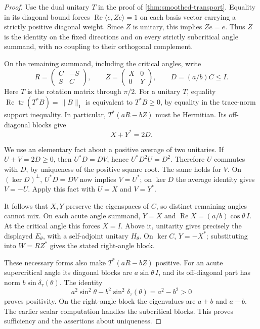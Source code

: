 \begin{proof}
Use the dual unitary $T$ in the proof of
\cref{thm:smoothed-transport}. Equality in its diagonal bound forces
$\operatorname{Re}\langle e,Ze\rangle=1$ on each basis vector carrying
a strictly positive diagonal weight. Since $Z$ is unitary, this implies
$Ze=e$. Thus $Z$ is the identity on the fixed directions and on every
strictly subcritical angle summand, with no coupling to their orthogonal
complement.

On the remaining summand, including the critical angles, write
\[
 R=\begin{pmatrix}C&-S\\S&C\end{pmatrix},\qquad
 Z=\begin{pmatrix}X&0\\0&Y\end{pmatrix},\qquad
 D=(a/b)C\leq I.
\]
Here $T$ is the rotation matrix through $\pi/2$. For a unitary $T$, equality
$\operatorname{Re}\operatorname{tr}(T^*B)=\|B\|_1$ is equivalent to
$T^*B\geq0$, by equality in the trace-norm support inequality.
In particular, $T^*(aR-bZ)$ must be Hermitian. Its off-diagonal blocks
give
\begin{equation}
 X+Y^*=2D.
 \label{eq:smoothed-unitary-average}
\end{equation}

We use an elementary fact about a positive average of two unitaries.
If $U+V=2D\geq0$, then $U^*D=DV$, hence
$U^*D^2U=D^2$. Therefore $U$ commutes with $D$, by uniqueness of the
positive square root. The same holds for $V$. On $(\ker D)^\perp$,
$U^*D=DV$ now implies $V=U^*$; on $\ker D$ the average identity gives
$V=-U$. Apply this fact with $U=X$ and $V=Y^*$.

It follows that $X,Y$ preserve the eigenspaces of $C$, so distinct
remaining angles cannot mix. On each acute angle summand, $Y=X$ and
$\operatorname{Re}X=(a/b)\cos\theta\,I$. At the critical angle this
forces $X=I$. Above it, unitarity gives precisely the displayed
$E_\theta$, with a self-adjoint unitary $H_\theta$. On $\ker C$,
$Y=-X^*$; substituting into $W=RZ^*$ gives the stated right-angle block.

These necessary forms also make $T^*(aR-bZ)$ positive. For an acute
supercritical angle its diagonal blocks are $a\sin\theta\,I$, and
its off-diagonal part has norm $b\sin\delta_\tau(\theta)$. The identity
\[
 a^2\sin^2\theta-b^2\sin^2\delta_\tau(\theta)=a^2-b^2>0
\]
proves positivity. On the right-angle block the eigenvalues are $a+b$
and $a-b$. The earlier scalar computation handles the subcritical
blocks. This proves sufficiency and the assertions about uniqueness.
\end{proof}

